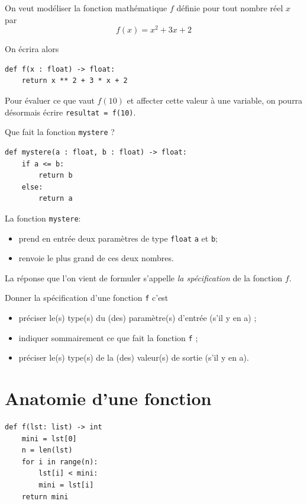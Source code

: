 \begin{exemple}
    On veut modéliser la fonction mathématique $f$ définie pour tout nombre réel $x$ par $$f(x)=x^2+3x +2$$

    On écrira alors

    \begin{verbatim}
def f(x : float) -> float:
    return x ** 2 + 3 * x + 2
            \end{verbatim}

    Pour évaluer ce que vaut $f(10)$ et affecter cette valeur à une variable, on pourra désormais écrire \texttt{resultat = f(10)}.
\end{exemple}


Que fait la fonction \texttt{mystere} ?

\begin{verbatim}
def mystere(a : float, b : float) -> float:
    if a <= b:
        return b
    else:
        return a            
\end{verbatim}



La fonction \texttt{mystere}:
\begin{itemize}
    \item   prend en entrée deux paramètres de type \texttt{float} \texttt{a} et \texttt{b};
    \item   renvoie le plus grand de ces deux nombres.
\end{itemize}

La réponse que l'on vient de formuler s'appelle \textit{la spécification} de la fonction $f$.

\begin{definition}[ : fonction]
    Donner la spécification d'une fonction \texttt{f} c'est
    \begin{itemize}
        \item   préciser le(s) type(s) du (des) paramètre(s) d'entrée (s'il y en a) ;
        \item   indiquer sommairement ce que fait la fonction \texttt{f} ;
        \item   préciser le(s) type(s) de la (des) valeur(s) de sortie (s'il y en a).
    \end{itemize}
\end{definition}

\section{Anatomie d'une fonction}
\begin{pyc}
\begin{verbatim}
def f(lst: list) -> int
    mini = lst[0]
    n = len(lst)
    for i in range(n):
        lst[i] < mini:
        mini = lst[i]
    return mini
   \end{verbatim}
\end{pyc}


